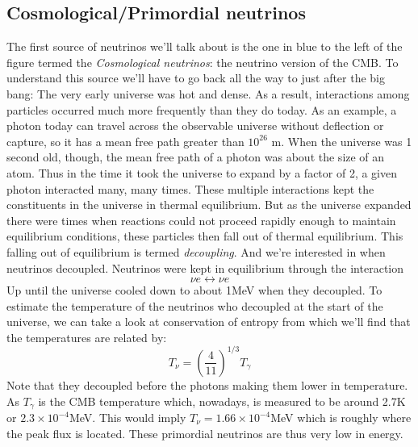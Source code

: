 \subsection{Cosmological/Primordial neutrinos}
The first source of neutrinos we'll talk about is the one in blue to the left of the figure
termed the \textit{Cosmological neutrinos}: 
the neutrino version of the CMB.
To understand this source we'll have to go back all the way to just after the big bang:
The very early universe was hot and dense. As a result, interactions among particles
occurred much more frequently than they do today. As an example, a photon today
can travel across the observable universe without deflection or capture, so it has a
mean free path greater than $10^{26}$ m. When the universe was 1 second old, though, 
the mean free path of a photon was about the size of an atom. Thus in
the time it took the universe to expand by a factor of 2, a given photon interacted
many, many times. These multiple interactions kept the constituents in the universe
in thermal equilibrium. But as the universe expanded there were times when reactions could
not proceed rapidly enough to maintain equilibrium conditions, these particles then fall out
of thermal equilibrium. This falling out of equilibrium is termed \textit{decoupling}.
And we're interested in when neutrinos decoupled.
Neutrinos were kept in equilibrium through the interaction 
\begin{equation}
	\nu e \leftrightarrow \nu e
\end{equation}
Up until the universe cooled down to about 1MeV when they decoupled.
To estimate the temperature of the neutrinos who decoupled at the start of the universe, 
we can take a look at conservation of entropy \cite{Dodelson} from which we'll find that
the temperatures are related by:
\begin{equation}
	T_\nu = \left(\frac{4}{11}\right)^{1/3}T_\gamma
\end{equation}
Note that they decoupled before the photons making them lower in temperature.
As $T_\gamma$ is the CMB temperature which, nowadays, is measured to be around
2.7K or $2.3\times10^{-4}$MeV. This would imply $T_\nu = 1.66\times 10^{-4}$MeV which
is roughly where the peak flux is located.  These primordial neutrinos are thus very
low in energy.
